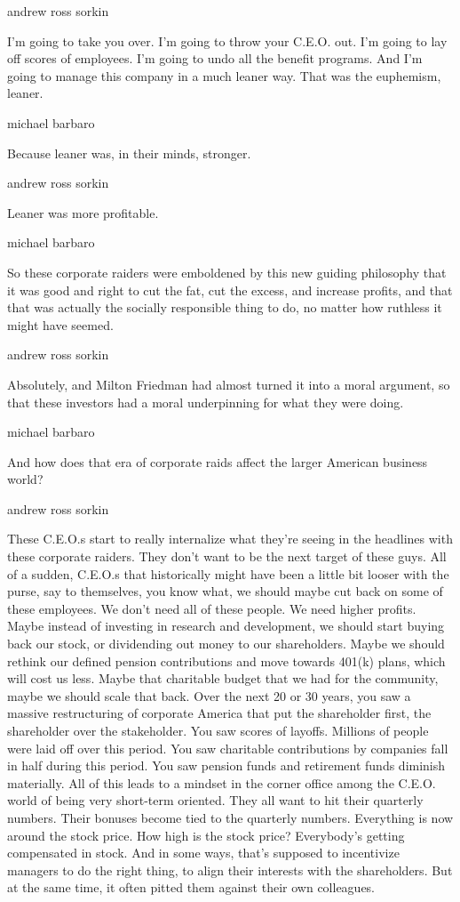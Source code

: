 andrew ross sorkin

I'm going to take you over. I'm going to throw your C.E.O. out. I'm
going to lay off scores of employees. I'm going to undo all the benefit
programs. And I'm going to manage this company in a much leaner way.
That was the euphemism, leaner.

michael barbaro

Because leaner was, in their minds, stronger.

andrew ross sorkin

Leaner was more profitable.

michael barbaro

So these corporate raiders were emboldened by this new guiding
philosophy that it was good and right to cut the fat, cut the excess,
and increase profits, and that that was actually the socially
responsible thing to do, no matter how ruthless it might have seemed.

andrew ross sorkin

Absolutely, and Milton Friedman had almost turned it into a moral
argument, so that these investors had a moral underpinning for what they
were doing.

michael barbaro

And how does that era of corporate raids affect the larger American
business world?

andrew ross sorkin

These C.E.O.s start to really internalize what they're seeing in the
headlines with these corporate raiders. They don't want to be the next
target of these guys. All of a sudden, C.E.O.s that historically might
have been a little bit looser with the purse, say to themselves, you
know what, we should maybe cut back on some of these employees. We don't
need all of these people. We need higher profits. Maybe instead of
investing in research and development, we should start buying back our
stock, or dividending out money to our shareholders. Maybe we should
rethink our defined pension contributions and move towards 401(k) plans,
which will cost us less. Maybe that charitable budget that we had for
the community, maybe we should scale that back. Over the next 20 or 30
years, you saw a massive restructuring of corporate America that put the
shareholder first, the shareholder over the stakeholder. You saw scores
of layoffs. Millions of people were laid off over this period. You saw
charitable contributions by companies fall in half during this period.
You saw pension funds and retirement funds diminish materially. All of
this leads to a mindset in the corner office among the C.E.O. world of
being very short-term oriented. They all want to hit their quarterly
numbers. Their bonuses become tied to the quarterly numbers. Everything
is now around the stock price. How high is the stock price? Everybody's
getting compensated in stock. And in some ways, that's supposed to
incentivize managers to do the right thing, to align their interests
with the shareholders. But at the same time, it often pitted them
against their own colleagues.

